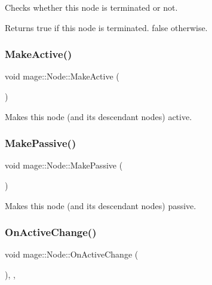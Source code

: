 Checks whether this node is terminated or not.

\begin{DoxyReturn}{Returns}
{\ttfamily true} if this node is terminated. {\ttfamily false} otherwise. 
\end{DoxyReturn}
\hypertarget{classmage_1_1_node_a3945ebd27cbb587d3fd0140df55eb4fb}{}\label{classmage_1_1_node_a3945ebd27cbb587d3fd0140df55eb4fb} 
\subsubsection{\texorpdfstring{Make\+Active()}{MakeActive()}}
{\footnotesize\ttfamily void mage\+::\+Node\+::\+Make\+Active (\begin{DoxyParamCaption}{ }\end{DoxyParamCaption})\hspace{0.3cm}{\ttfamily [noexcept]}}

Makes this node (and its descendant nodes) active. \hypertarget{classmage_1_1_node_aee4af2ccc576c422643d478ffafce5c4}{}\label{classmage_1_1_node_aee4af2ccc576c422643d478ffafce5c4} 
\subsubsection{\texorpdfstring{Make\+Passive()}{MakePassive()}}
{\footnotesize\ttfamily void mage\+::\+Node\+::\+Make\+Passive (\begin{DoxyParamCaption}{ }\end{DoxyParamCaption})\hspace{0.3cm}{\ttfamily [noexcept]}}

Makes this node (and its descendant nodes) passive. \hypertarget{classmage_1_1_node_a65c1c55801a8e1d5354ac79d0c2fca6e}{}\label{classmage_1_1_node_a65c1c55801a8e1d5354ac79d0c2fca6e} 
\subsubsection{\texorpdfstring{On\+Active\+Change()}{OnActiveChange()}}
{\footnotesize\ttfamily void mage\+::\+Node\+::\+On\+Active\+Change (\begin{DoxyParamCaption}{ }\end{DoxyParamCaption})\hspace{0.3cm}{\ttfamily [private]}, {\ttfamily [virtual]}, {\ttfamily [noexcept]}}


